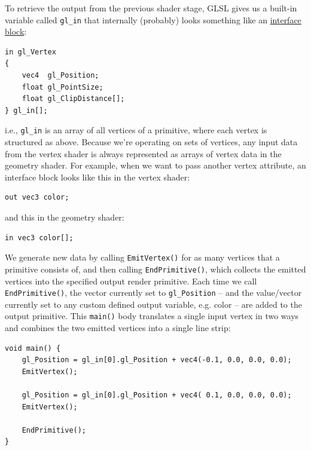 \documentclass[table, xcdraw]{article}%
\begin{document}
\begin{enumerate}
    To retrieve the output from the previous shader stage, GLSL gives us a built-in variable called \texttt{gl_in} that internally (probably) looks something like an \hyperref[interface_block]{interface block}:

    \begin{verbatim}
in gl_Vertex
{
    vec4  gl_Position;
    float gl_PointSize;
    float gl_ClipDistance[];
} gl_in[];
    \end{verbatim}

    i.e., \texttt{gl_in} is an array of all vertices of a primitive, where each vertex is structured as above. Because we're operating on sets of vertices, any input data from the vertex shader is always represented as arrays of vertex data in the geometry shader. For example, when we want to pass another vertex attribute, an interface block looks like this in the vertex shader:

    \begin{verbatim}
out vec3 color;
    \end{verbatim}

    and this in the geometry shader:

    \begin{verbatim}
in vec3 color[];
    \end{verbatim}
    
    We generate new data by calling \texttt{EmitVertex()} for as many vertices that a primitive consists of, and then calling \texttt{EndPrimitive()}, which collects the emitted vertices into the specified output render primitive. Each time we call \texttt{EndPrimitive()}, the vector currently set to \texttt{gl_Position} -- and the value/vector currently set to any custom defined output variable, e.g. color -- are added to the output primitive. This \texttt{main()} body translates a single input vertex in two ways and combines the two emitted vertices into a single line strip:

    \begin{verbatim}
void main() {    
    gl_Position = gl_in[0].gl_Position + vec4(-0.1, 0.0, 0.0, 0.0); 
    EmitVertex();

    gl_Position = gl_in[0].gl_Position + vec4( 0.1, 0.0, 0.0, 0.0);
    EmitVertex();
    
    EndPrimitive();
}
    \end{verbatim}
    

\end{enumerate}
\end{document}
